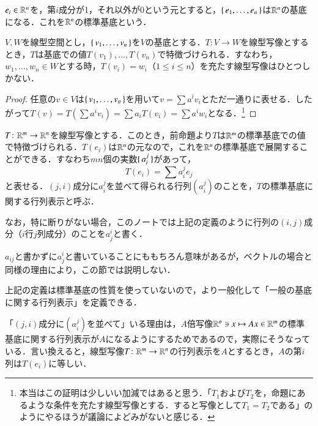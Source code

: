 \begin{que}
$e_i \in \mathbb{R}^n$を，第$i$成分が1，それ以外が0という元とすると，$\set{e_1, \dots, e_n}$は$\mathbb{R}^n$の基底になる．これを$\mathbb{R}^n$の標準基底という．
\end{que}

\begin{prop}
$V,W$を線型空間とし，$\set{v_1, \dots, v_n}$を$V$の基底とする．$T \colon V \to W$を線型写像とするとき，$T$は基底での値$T(v_1),\dots, T(v_n)$で特徴づけられる．すなわち，$w_1,\dots, w_n \in W$とする時，$T(v_i) = w_i$（$1 \leq i \leq n$）を充たす線型写像はひとつしかない．
\end{prop}

\begin{proof}
任意の$v \in V$は$\set{v_1, \dots, v_n}$を用いて$v = \sum a^i v_i$とただ一通りに表せる．したがって$T(v) = T(\sum a^i v_i) = \sum a_i T(v_i) = \sum a^i w_i$となる．\footnote{本当はこの証明は少しいい加減ではあると思う．「$T_1$および$T_2$を，命題にあるような条件を充たす線型写像とする．すると写像として$T_1=T_2$である」のようにやるほうが議論によどみがないと感じる．}
\end{proof}

\begin{defi}
$T \colon \mathbb{R}^m \to \mathbb{R}^n$を線型写像とする．このとき，前命題より$T$は$\mathbb{R}^m$の標準基底での値で特徴づけられる．$T(e_i)$は$\mathbb{R}^n$の元なので，これを$\mathbb{R}^n$の標準基底で展開することができる．すなわち$mn$個の実数$\set{a_i^j}$があって，
\begin{equation}
T(e_i) = \sum a_{i}^j e_j
\end{equation}
と表せる．$(j,i)$成分に$a_{i}^j$を並べて得られる行列$\left(a_{i}^j\right)$のことを，$T$の標準基底に関する行列表示と呼ぶ．
\end{defi}

なお，特に断りがない場合，このノートでは上記の定義のように行列の$(i,j)$成分（$i$行$j$列成分）のことを$a^i_j$と書く．

\begin{dig}
$a_{ij}$と書かずに$a^i_j$と書いていることにももちろん意味があるが，ベクトルの場合と同様の理由により，この節では説明しない．
\end{dig}

\begin{que}
上記の定義は標準基底の性質を使っていないので，より一般化して「一般の基底に関する行列表示」を定義できる．
\end{que}

\begin{que}
「$(j,i)$成分に$\left(a^j_i\right)$を並べて」いる理由は，$A$倍写像$\mathbb{R}^n \ni x \mapsto Ax \in \mathbb{R}^m$の標準基底に関する行列表示が$A$になるようにするためであるので，実際にそうなっている．言い換えると，線型写像$T \colon \mathbb{R}^m \to \mathbb{R}^n$の行列表示を$A$とするとき，$A$の第$i$列は$T(e_i)$に等しい．
\end{que}

